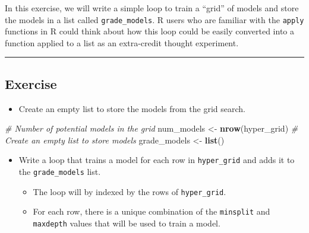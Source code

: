 \documentclass[
]{book}
\newenvironment{Shaded}{\begin{snugshade}}{\end{snugshade}}
\newcommand{\CommentTok}[1]{\textcolor[rgb]{0.56,0.35,0.01}{\textit{#1}}}
\newcommand{\KeywordTok}[1]{\textcolor[rgb]{0.13,0.29,0.53}{\textbf{#1}}}
\newcommand{\NormalTok}[1]{#1}
\newcommand{\StringTok}[1]{\textcolor[rgb]{0.31,0.60,0.02}{#1}}
\providecommand{\tightlist}{%
  \setlength{\itemsep}{0pt}\setlength{\parskip}{0pt}}
\begin{document}
In this exercise, we will write a simple loop to train a ``grid'' of models and store the models in a list called \texttt{grade\_models}. R users who are familiar with the \texttt{apply} functions in R could think about how this loop could be easily converted into a function applied to a list as an extra-credit thought experiment.

\begin{center}\rule{0.5\linewidth}{0.5pt}\end{center}

\hypertarget{exercise-9}{%
\subsection*{Exercise}\label{exercise-9}}

\begin{itemize}
\tightlist
\item
  Create an empty list to store the models from the grid search.
\end{itemize}

\begin{Shaded}
\begin{Highlighting}[]
\CommentTok{# Number of potential models in the grid}
\NormalTok{num_models <-}\StringTok{ }\KeywordTok{nrow}\NormalTok{(hyper_grid)}
\CommentTok{# Create an empty list to store models}
\NormalTok{grade_models <-}\StringTok{ }\KeywordTok{list}\NormalTok{()}
\end{Highlighting}
\end{Shaded}

\begin{itemize}
\tightlist
\item
  Write a loop that trains a model for each row in \texttt{hyper\_grid} and adds it to the \texttt{grade\_models} list.

  \begin{itemize}
  \tightlist
  \item
    The loop will by indexed by the rows of \texttt{hyper\_grid}.
  \item
    For each row, there is a unique combination of the \texttt{minsplit} and \texttt{maxdepth} values that will be used to train a model.
  \end{itemize}
\end{itemize}
\end{document}
